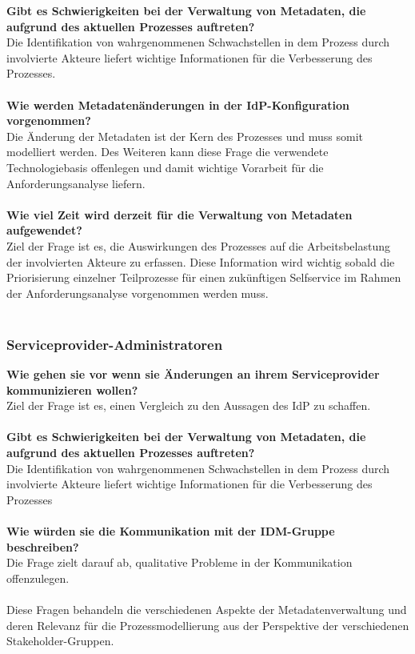 \textbf{Gibt es Schwierigkeiten bei der Verwaltung von Metadaten, die aufgrund des aktuellen Prozesses auftreten?}\\
 Die Identifikation von wahrgenommenen Schwachstellen in dem Prozess durch involvierte Akteure liefert wichtige Informationen für die Verbesserung des Prozesses.\\\\
\textbf{Wie werden Metadatenänderungen in der IdP-Konfiguration vorgenommen?}\\
Die Änderung der Metadaten ist der Kern des Prozesses und muss somit modelliert werden. Des Weiteren kann diese Frage die verwendete Technologiebasis offenlegen und damit wichtige Vorarbeit für die Anforderungsanalyse liefern.\\\\
\textbf{Wie viel Zeit wird derzeit für die Verwaltung von Metadaten aufgewendet?}\\
Ziel der Frage ist es, die Auswirkungen des Prozesses auf die Arbeitsbelastung der involvierten Akteure zu erfassen. Diese Information wird wichtig sobald die Priorisierung einzelner Teilprozesse für einen zukünftigen Selfservice im Rahmen der Anforderungsanalyse vorgenommen werden muss.\\\\

\subsubsection{Serviceprovider-Administratoren}
\textbf{Wie gehen sie vor wenn sie Änderungen an ihrem Serviceprovider kommunizieren wollen?}\\
Ziel der Frage ist es, einen Vergleich zu den Aussagen des IdP zu schaffen.\\\\
\textbf{Gibt es Schwierigkeiten bei der Verwaltung von Metadaten, die aufgrund des aktuellen Prozesses auftreten?}\\
Die Identifikation von wahrgenommenen Schwachstellen in dem Prozess durch involvierte Akteure liefert wichtige Informationen für die Verbesserung des Prozesses\\\\
\textbf{Wie würden sie die Kommunikation mit der IDM-Gruppe beschreiben?}\\
Die Frage zielt darauf ab, qualitative Probleme in der Kommunikation offenzulegen.\\\\


Diese Fragen behandeln die verschiedenen Aspekte der Metadatenverwaltung und deren Relevanz für die Prozessmodellierung aus der Perspektive der verschiedenen Stakeholder-Gruppen.
